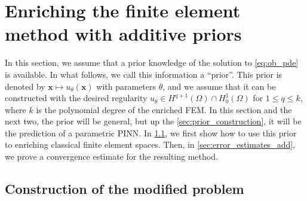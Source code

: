 
\section{Enriching the finite element method with additive priors}
\label{sec:additive_prior}

In this section, we assume that a prior knowledge of the solution to \eqref{eq:ob_pde} is available. In what follows, we call this information a ``prior''.
This prior is denoted by $\bm{x} \mapsto u_{\theta}(\bm{x})$ with parameters $\theta$, and we assume that it can be constructed with the desired regularity $u_{\theta} \in H^{q+1}(\Omega)\cap H_0^1(\Omega)$ for $1\leqslant q\leqslant k$, where $k$ is the polynomial degree of the enriched FEM.
In this section and the next two, the prior will be general, but up the \cref{sec:prior_construction}, it will be the prediction of a parametric PINN.
In \cref{sec:modified_problem_add}, we first show how to use this prior to enriching classical finite element spaces.
Then, in \cref{sec:error_estimates_add}, we prove a convergence estimate for the resulting method.

\subsection{Construction of the modified problem}
\label{sec:modified_problem_add}

